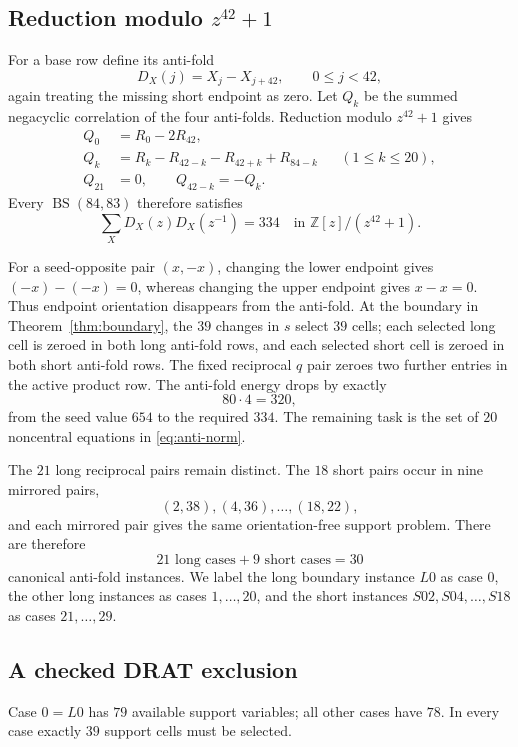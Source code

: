 \documentclass[11pt]{article}
\theoremstyle{remark}
\newcommand{\Z}{\mathbb Z}
\newcommand{\BS}{\operatorname{BS}}
\begin{document}
\subsection{Reduction modulo \texorpdfstring{$z^{42}+1$}{z42+1}}

For a base row define its anti-fold
\[
 D_X(j)=X_j-X_{j+42},\qquad 0\leq j<42,
\]
again treating the missing short endpoint as zero.  Let $Q_k$ be the
summed negacyclic correlation of the four anti-folds.  Reduction modulo
$z^{42}+1$ gives
\begin{align}
 Q_0&=R_0-2R_{42},\nonumber\\
 Q_k&=R_k-R_{42-k}-R_{42+k}+R_{84-k}
       &&(1\leq k\leq20),                       \label{eq:antifold}\\
 Q_{21}&=0,\qquad Q_{42-k}=-Q_k.\nonumber
\end{align}
Every $\BS(84,83)$ therefore satisfies
\[
 \sum_X D_X(z)D_X(z^{-1})=334
 \quad\text{in }\Z[z]/(z^{42}+1).                    \label{eq:anti-norm}
\]

For a seed-opposite pair $(x,-x)$, changing the lower endpoint gives
$(-x)-(-x)=0$, whereas changing the upper endpoint gives $x-x=0$.
Thus endpoint orientation disappears from the anti-fold.  At the boundary
in Theorem~\ref{thm:boundary}, the $39$ changes in $s$ select $39$ cells;
each selected long cell is zeroed in both long anti-fold rows, and each
selected short cell is zeroed in both short anti-fold rows.  The fixed
reciprocal $q$ pair zeroes two further entries in the active product row.
The anti-fold energy drops by exactly
\[
 80\cdot4=320,
\]
from the seed value $654$ to the required $334$.  The remaining task is
the set of $20$ noncentral equations in \eqref{eq:anti-norm}.

The $21$ long reciprocal pairs remain distinct.  The $18$ short pairs
occur in nine mirrored pairs,
\[
 (2,38),(4,36),\ldots,(18,22),
\]
and each mirrored pair gives the same orientation-free support problem.
There are therefore
\[
 21\text{ long cases}+9\text{ short cases}=30
\]
canonical anti-fold instances.  We label the long boundary instance
$L0$ as case $0$, the other long instances as cases $1,\ldots,20$, and
the short instances $S02,S04,\ldots,S18$ as cases $21,\ldots,29$.

\subsection{A checked DRAT exclusion}

Case $0=L0$ has $79$ available support variables; all other cases have
$78$.  In every case exactly $39$ support cells must be selected.
\end{document}
